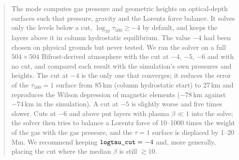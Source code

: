 


\begin{abstract}
\noindent The mode  computes gas pressure and geometric heights on optical-depth surfaces such that
pressure, gravity and the Lorentz force balance. It solves only the levels below a cut, $\log_{10}\tau_{500}\ge-4$ by
default, and keeps the layers above it in column hydrostatic equilibrium. The value $-4$ had been chosen on physical grounds
but never tested. We ran the solver on a full $504\times504$ Bifrost-derived atmosphere with the cut at $-4$, $-5$, $-6$ and
with no cut, and compared each result with the simulation's own pressures and heights. The cut at $-4$ is the only one that
converges; it reduces the error of the $\tau_{500}=1$ surface from 85\,km (column hydrostatic start) to 27\,km and
reproduces the Wilson depression of magnetic elements ($-78$\,km against $-74$\,km in the simulation). A cut at $-5$ is
slightly worse and five times slower. Cuts at $-6$ and above put layers with plasma $\beta\ll1$ into the solve; the solver
then tries to balance a Lorentz force of 10--1000 times the weight of the gas with the gas pressure, and the $\tau=1$ surface
is displaced by 1--20\,Mm. We recommend keeping $\code{logtau\_cut}=-4$ and, more generally, placing the cut where the
median $\beta$ is still $\gtrsim10$.
\end{abstract}

